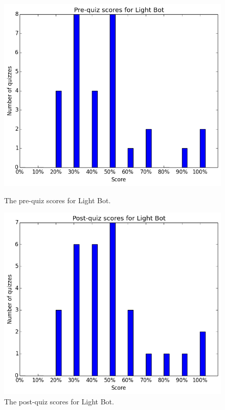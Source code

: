 			\begin{figure}[h] 
			\centering 
			\begin{minipage}[b]{0.45\linewidth}
			\includegraphics[width=\textwidth]{lightbot_pre.png} 
			\caption{The pre-quiz scores for Light Bot.}
			\end{minipage}
			\quad
			\begin{minipage}[b]{0.45\linewidth}
			\includegraphics[width=\textwidth]{lightbot_post.png} 
			\caption{The post-quiz scores for Light Bot.}
			\end{minipage}
			\end{figure}

